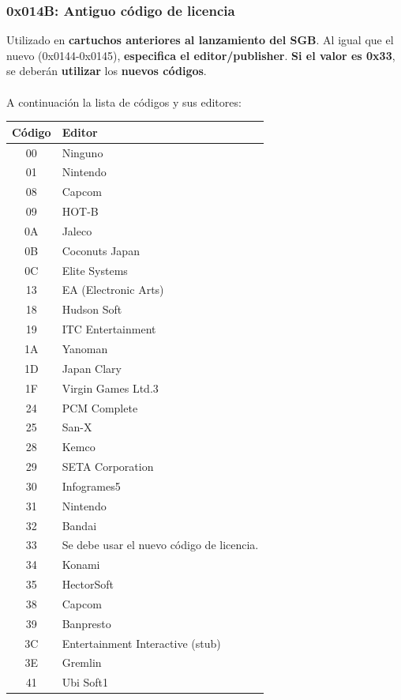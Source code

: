 \subsubsection{0x014B: Antiguo código de licencia}
Utilizado en \textbf{cartuchos anteriores al lanzamiento del SGB}. Al igual que el nuevo (0x0144-0x0145), \textbf{especifica el editor/publisher}. \textbf{Si el valor es 0x33}, se deberán \textbf{utilizar} los \textbf{nuevos códigos}.
\\\\
A continuación la lista de códigos y sus editores:
\begin{longtable}{|c|l|}
\hline
\textbf{Código} & \textbf{Editor} \\ \hline
00 & Ninguno \\\hline
01 & Nintendo \\\hline
08 & Capcom \\\hline
09 & HOT-B \\\hline
0A & Jaleco \\\hline
0B & Coconuts Japan \\\hline
0C & Elite Systems \\\hline
13 & EA (Electronic Arts) \\\hline
18 & Hudson Soft \\\hline
19 & ITC Entertainment \\\hline
1A & Yanoman \\\hline
1D & Japan Clary \\\hline
1F & Virgin Games Ltd.3 \\\hline
24 & PCM Complete \\\hline
25 & San-X \\\hline
28 & Kemco \\\hline
29 & SETA Corporation \\\hline
30 & Infogrames5 \\\hline
31 & Nintendo \\\hline
32 & Bandai \\\hline
33 & Se debe usar el nuevo código de licencia. \\\hline
34 & Konami \\\hline
35 & HectorSoft \\\hline
38 & Capcom \\\hline
39 & Banpresto \\\hline
3C & Entertainment Interactive (stub) \\\hline
3E & Gremlin \\\hline
41 & Ubi Soft1 \\\hline

\end{longtable}

